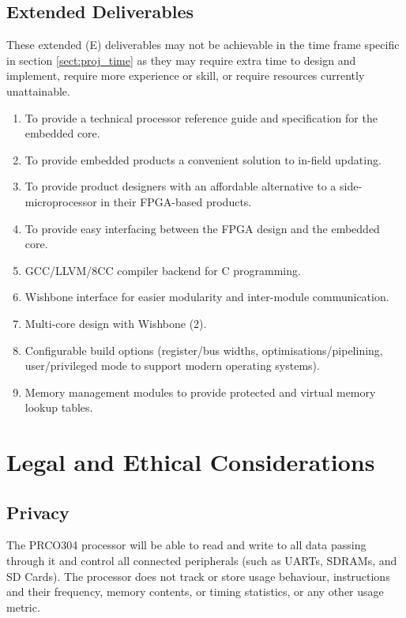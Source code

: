 \documentclass[11pt,a4paper]{report}
\newcommand{\scname}{PRCO304}
\begin{document}
\subsection{Extended Deliverables}
These extended (E) deliverables may not be achievable in the time frame specific in section \ref{sect:proj_time} as they may require extra time to design and implement, require more experience or skill, or require resources currently unattainable.
\begin{enumerate}[label=\bfseries E\arabic*.]
\item{To provide a technical processor reference guide and specification for the embedded core.}
\item{To provide embedded products a convenient solution to in-field updating.}
\item{To provide product designers with an affordable alternative to a side-microprocessor in their FPGA-based products.}
\item{To provide easy interfacing between the FPGA design and the embedded core.}
\item{GCC/LLVM/8CC compiler backend for C programming.}\label{sect:deliv:ed:gcc}
\item{Wishbone interface for easier modularity and inter-module communication.}
\item{Multi-core design with Wishbone (2).}
\item{Configurable build options (register/bus widths, optimisations/pipelining, user/privileged mode to support modern operating systems).}
\item{Memory management modules to provide protected and virtual memory lookup tables.}
\end{enumerate}


\newpage
\section{Legal and Ethical Considerations}
\subsection{Privacy}
The \scname{} processor will be able to read and write to all data passing through it and control all connected peripherals (such as UARTs, SDRAMs, and SD Cards). The processor does not track or store usage behaviour, instructions and their frequency,   memory contents, or timing statistics, or any other usage metric.
\end{document}
